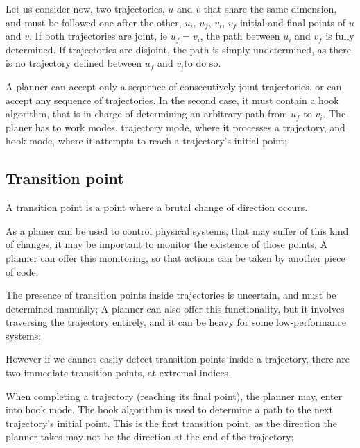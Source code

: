 Let us consider now, two trajectories, $u$ and $v$ that share the same dimension, and must be followed one 
after the other, $u_i$, $u_f$, $v_i$, $v_f$ initial and final points of $u$ and $v$.
If both trajectories are joint, ie $u_f = v_i$, the path between $u_i$ and $v_f$ is fully determined.
If trajectories are disjoint, the path is simply undetermined, as there is no trajectory defined between
$u_f$ and $ v_i$to do so.
\newline

A planner can accept only a sequence of consecutively joint trajectories, or can accept any sequence of 
trajectories.
In the second case, it must contain a hook algorithm, that is in charge of determining an arbitrary path
from $u_f$ to $ v_i$.
The planer has to work modes, trajectory mode, where it processes a trajectory, and hook mode, where it 
attempts to reach a trajectory's initial point;

\newpage


\subsection{Transition point}

A transition point is a point where a brutal change of direction occurs.
\newline

As a planer can be used to control physical systems, that may suffer of this kind of changes, it may be 
important to monitor the existence of those points.
A planner can offer this monitoring, so that actions can be taken by another piece of code.
\newline

The presence of transition points inside trajectories is uncertain, and must be determined manually;
A planner can also offer this functionality, but it involves traversing the trajectory entirely, and 
it can be heavy for some low-performance systems;
\newline

However if we cannot easily detect transition points inside a trajectory, there are two immediate 
transition points, at extremal indices.
\newline

When completing a trajectory (reaching its final point), the planner may, enter into hook mode.
The hook algorithm is used to determine a path to the next trajectory's initial point.
This is the first transition point, as the direction the planner takes may not be the direction at the end
of the trajectory;
\newline


